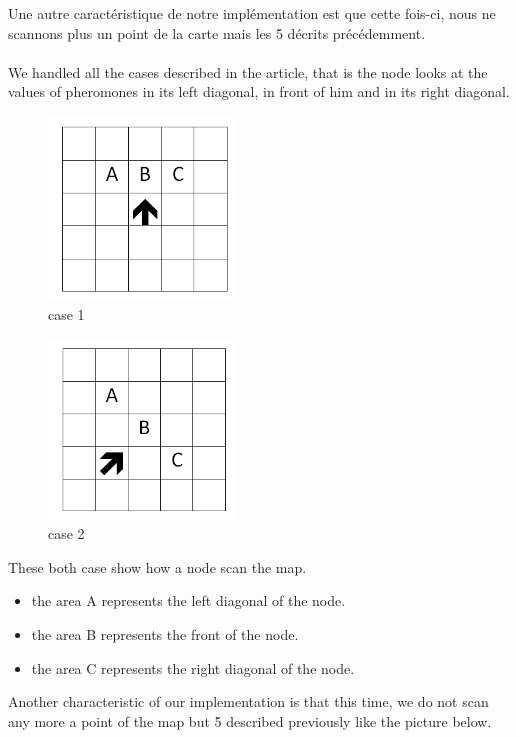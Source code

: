Une autre caractéristique de notre implémentation est que cette fois-ci, nous ne scannons plus un point de la carte mais les 5 décrits précédemment.\\\\

We handled all the cases described in the article, that is the node looks at the values of pheromones in its left diagonal, in front of him and in its right diagonal.

\begin{figure}[!h]
\center
\includegraphics[width=5cm]{../images/grille_case_1.png}
\caption{case 1}
\end{figure}

\begin{figure}[!h]
\center
\includegraphics[width=5cm]{../images/grille_case_2.png}
\caption{case 2}
\end{figure}

These both case show how a node scan the map.
\begin{itemize}
\item the area A represents the left diagonal of the node.
\item the area B represents the front of the node.
\item the area C represents the right diagonal of the node.
\end{itemize}

Another characteristic of our implementation is that this time, we do not scan any more a point of the map but 5 described previously  like the picture below.

